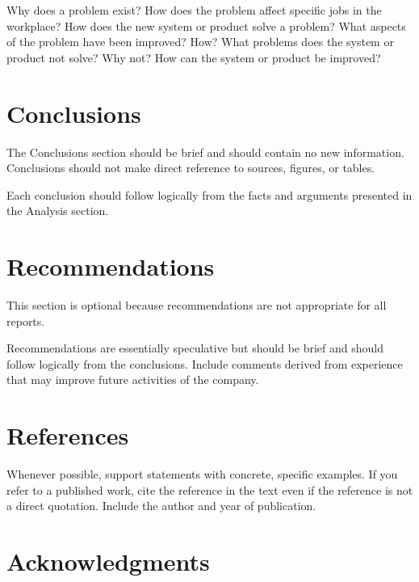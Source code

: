 \documentclass[12pt]{article}
\begin{document}
Why does a problem exist?
How does the problem affect specific jobs in the workplace?
How does the new system or product solve a problem?
What aspects of the problem have been improved? How?
What problems does the system or product not solve? Why not?
How can the system or product be improved?


\section{Conclusions}


The Conclusions section should be brief and should contain no new information. Conclusions should not make direct reference to sources, figures, or tables.

Each conclusion should follow logically from the facts and arguments presented in the Analysis section.


\section{Recommendations}


This section is optional because recommendations are not appropriate for all reports.

Recommendations are essentially speculative but should be brief and should follow logically from the conclusions. Include comments derived from experience that may improve future activities of the company.


\newpage
{}
\section*{References}


Whenever possible, support statements with concrete, specific examples. If you refer to a published work, cite the reference in the text even if the reference is not a direct quotation. Include the author and year of publication.



\newpage
{}
\section*{Acknowledgments}

\end{document}
